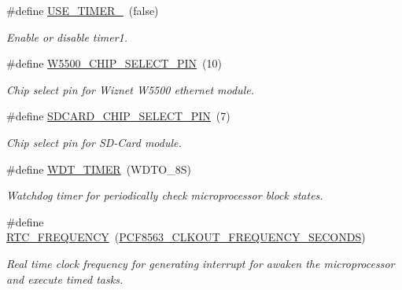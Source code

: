 \begin{DoxyCompactItemize}
\#define \hyperlink{rmap-config_8h_a8051c2a569a9f9c488af89bce47ec306}{U\+S\+E\+\_\+\+T\+I\+M\+E\+R\+\_}~(false)
\begin{DoxyCompactList}\small\item\em Enable or disable timer1. \end{DoxyCompactList}\item 
\mbox{\label{rmap-config_8h_a487cf0916151ca6772bc10ad17de96f8}} 
\#define \hyperlink{rmap-config_8h_a487cf0916151ca6772bc10ad17de96f8}{W5500\+\_\+\+C\+H\+I\+P\+\_\+\+S\+E\+L\+E\+C\+T\+\_\+\+P\+IN}~(10)
\begin{DoxyCompactList}\small\item\em Chip select pin for Wiznet W5500 ethernet module. \end{DoxyCompactList}\item 
\mbox{\label{rmap-config_8h_a52845a6b315de684e7eda2ffe7863b55}} 
\#define \hyperlink{rmap-config_8h_a52845a6b315de684e7eda2ffe7863b55}{S\+D\+C\+A\+R\+D\+\_\+\+C\+H\+I\+P\+\_\+\+S\+E\+L\+E\+C\+T\+\_\+\+P\+IN}~(7)
\begin{DoxyCompactList}\small\item\em Chip select pin for S\+D-\/\+Card module. \end{DoxyCompactList}\item 
\#define \hyperlink{rmap-config_8h_a983c9777673ee873f12ec9f489215321}{W\+D\+T\+\_\+\+T\+I\+M\+ER}~(W\+D\+T\+O\+\_\+8S)
\begin{DoxyCompactList}\small\item\em Watchdog timer for periodically check microprocessor block states. \end{DoxyCompactList}\item 
\mbox{\label{rmap-config_8h_a6b7af814754ac70e8aa5e34aa9295df5}} 
\#define \hyperlink{rmap-config_8h_a6b7af814754ac70e8aa5e34aa9295df5}{R\+T\+C\+\_\+\+F\+R\+E\+Q\+U\+E\+N\+CY}~(\hyperlink{pcf8563_8h_a3a76b38037d3ee5e0231c402a0f7f352}{P\+C\+F8563\+\_\+\+C\+L\+K\+O\+U\+T\+\_\+\+F\+R\+E\+Q\+U\+E\+N\+C\+Y\+\_\+\+S\+E\+C\+O\+N\+DS})
\begin{DoxyCompactList}\small\item\em Real time clock frequency for generating interrupt for awaken the microprocessor and execute timed tasks. \end{DoxyCompactList}\item 
\mbox{\label{rmap-config_8h_a1efb928882c9a9d83d78e499091a8319}} 

\end{DoxyCompactItemize}

